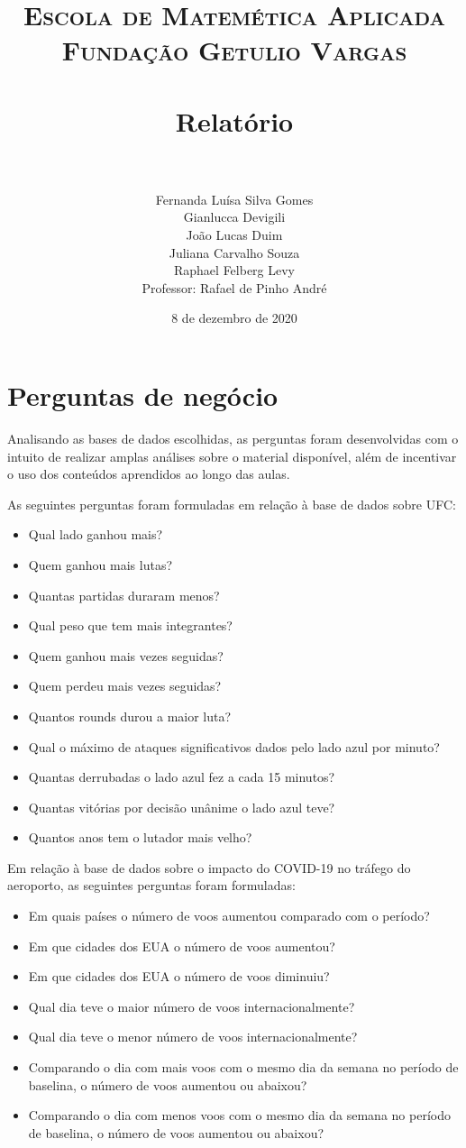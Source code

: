 \documentclass{article}
\title{	
\normalfont \normalsize 
\textsc{Escola de Matemética Aplicada} \\
\textsc{Fundação Getulio Vargas}\\ [25pt] 
\horrule{0.5pt} \\[0.4cm] 
\huge Relatório \\ 
\horrule{2pt} \\[0.5cm] 
}
\author{Fernanda Luísa Silva Gomes \\ Gianlucca Devigili \\ João Lucas Duim\\ Juliana Carvalho Souza \\ Raphael Felberg Levy\\[0.1cm]{Professor: Rafael de Pinho André}}
\date{8 de dezembro de 2020}
\begin{document}
\maketitle

\section{Perguntas de negócio}
Analisando as bases de dados escolhidas, as perguntas foram desenvolvidas com o intuito de realizar amplas análises sobre o material disponível, além de incentivar o uso dos conteúdos aprendidos ao longo das aulas. 
\par As seguintes perguntas foram formuladas em relação à base de dados sobre UFC:
\begin{itemize}
    \item Qual lado ganhou mais?
    \item Quem ganhou mais lutas?
    \item Quantas partidas duraram menos?
    \item Qual peso que tem mais integrantes?
    \item Quem ganhou mais vezes seguidas?
    \item Quem perdeu mais vezes seguidas?
    \item Quantos rounds durou a maior luta?
    \item Qual o máximo de ataques significativos dados pelo lado azul por minuto? 
    \item Quantas derrubadas o lado azul fez a cada 15 minutos?
    \item Quantas vitórias por decisão unânime o lado azul teve? 
    \item Quantos anos tem o lutador mais velho? 
\end{itemize}

\par Em relação à base de dados sobre o impacto do COVID-19 no tráfego do aeroporto, as seguintes perguntas foram formuladas:
\begin{itemize}
    \item Em quais países o número de voos aumentou comparado com o período?
    \item Em que cidades dos EUA o número de voos aumentou?
    \item Em que cidades dos EUA o número de voos diminuiu?
    \item Qual dia teve o maior número de voos internacionalmente?
    \item Qual dia teve o menor número de voos internacionalmente?
    \item Comparando o dia com mais voos com o mesmo dia da semana no período de baselina, o número de voos aumentou ou abaixou?
    \item Comparando o dia com menos voos com o mesmo dia da semana no período de baselina, o número de voos aumentou ou abaixou?
\end{itemize}
\end{document}
